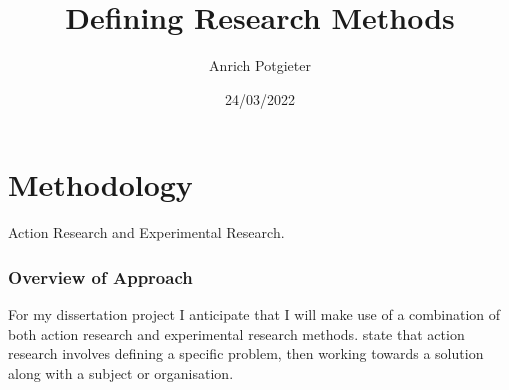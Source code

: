 \documentclass[12pt]{article}
\title{Defining Research Methods}
\author{Anrich Potgieter}
\date{24/03/2022}
\begin{document}
\maketitle
\tableofcontents

\section{Methodology}

Action Research and Experimental Research.

\subsubsection{Overview of Approach}

For my dissertation project I anticipate that I will make use of a combination of both action research and experimental research methods.
\autocite{dawsonChapterResearchMethods2015} state that action research involves defining a specific problem, then working towards a solution along with a subject or organisation. 

\printbibliography
\end{document}

